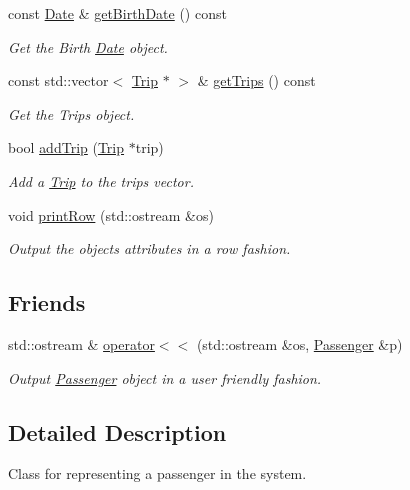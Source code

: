 \begin{DoxyCompactItemize}
const \mbox{\hyperlink{classDate}{Date}} \& \mbox{\hyperlink{classPassenger_aa2101584d2f0daf83ef58e0491754395}{get\+Birth\+Date}} () const
\begin{DoxyCompactList}\small\item\em Get the Birth \mbox{\hyperlink{classDate}{Date}} object. \end{DoxyCompactList}\item 
const std\+::vector$<$ \mbox{\hyperlink{classTrip}{Trip}} $\ast$ $>$ \& \mbox{\hyperlink{classPassenger_a06dfa54524d4ca1a85b1599b278fb871}{get\+Trips}} () const
\begin{DoxyCompactList}\small\item\em Get the Trips object. \end{DoxyCompactList}\item 
bool \mbox{\hyperlink{classPassenger_a2fef29e013c88ba7a75d259cebfa655d}{add\+Trip}} (\mbox{\hyperlink{classTrip}{Trip}} $\ast$trip)
\begin{DoxyCompactList}\small\item\em Add a \mbox{\hyperlink{classTrip}{Trip}} to the trips vector. \end{DoxyCompactList}\item 
void \mbox{\hyperlink{classPassenger_a72e4042544557a3dd9c02198aa2582d8}{print\+Row}} (std\+::ostream \&os)
\begin{DoxyCompactList}\small\item\em Output the object\textquotesingle{}s attributes in a row fashion. \end{DoxyCompactList}\end{DoxyCompactItemize}
\subsection*{Friends}
\begin{DoxyCompactItemize}
\item 
std\+::ostream \& \mbox{\hyperlink{classPassenger_a7b1aeaded08562578690b788f39db888}{operator$<$$<$}} (std\+::ostream \&os, \mbox{\hyperlink{classPassenger}{Passenger}} \&p)
\begin{DoxyCompactList}\small\item\em Output \mbox{\hyperlink{classPassenger}{Passenger}} object in a user friendly fashion. \end{DoxyCompactList}\end{DoxyCompactItemize}


\subsection{Detailed Description}
Class for representing a passenger in the system. 

